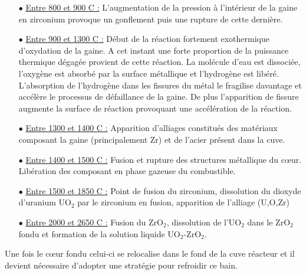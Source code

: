 \documentclass[a4paper,11pt,fleqn]{report}    %
\begin{document}
\begin{itemize}
	\item[$\bullet$] \underline{Entre 800 et 900 \textdegree C :} L'augmentation de la pression à l'intérieur de la gaine en zirconium provoque un gonflement puis une rupture de cette dernière.
	\item[$\bullet$] \underline{Entre 900 et 1300 \textdegree C :} Début de la réaction fortement exothermique d'oxydation de la gaine. A cet instant une forte proportion de la puissance thermique dégagée provient de cette réaction. La molécule d'eau est dissociée, l'oxygène est absorbé par la surface métallique et l'hydrogène est libéré. L'absorption de l'hydrogène dans les fissures du métal le fragilise davantage et accélère le processus de défaillance de la gaine. De plus l'apparition de fissure augmente la surface de réaction provoquant une accélération de la réaction.
	\item[$\bullet$] \underline{Entre 1300 et 1400 \textdegree C :} Apparition d'alliages constitués des matériaux composant la gaine (principalement Zr) et de l'acier présent dans la cuve.
	\item[$\bullet$] \underline{Entre 1400 et 1500 \textdegree C :} Fusion et rupture des structures métallique du c\oe ur. Libération des composant en phase gazeuse du combustible.
	\item[$\bullet$] \underline{Entre 1500 et 1850 \textdegree C :} Point de fusion du zirconium, dissolution du dioxyde d'uranium UO$_2$ par le zirconium en fusion, apparition de l'alliage (U,O,Zr)
	\item[$\bullet$] \underline{Entre 2000 et 2650 \textdegree C :} Fusion du ZrO$_2$, dissolution de l'UO$_2$ dans le ZrO$_2$ fondu et formation de la solution liquide UO$_2$-ZrO$_2$.
\end{itemize}
Une fois le c\oe ur fondu celui-ci se relocalise dans le fond de la cuve réacteur et il devient nécessaire d'adopter une stratégie pour refroidir ce bain.
\end{document}
